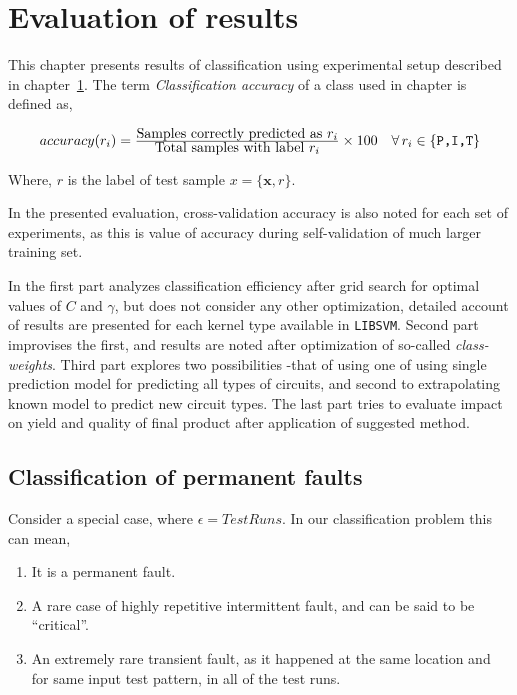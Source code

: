 \chapter{Evaluation of results}
\label{chap:chapter6}
This chapter presents results of classification using experimental setup described in chapter~\ref{chap:chapter6}. The term \emph{Classification accuracy} of a class used in chapter is defined as,

\[ \begin{array}{ll} accuracy(r_i) = \frac{\mbox{Samples correctly predicted as $r_i$}}
								{\mbox{Total samples with label $r_i$}}
							\times 100 & 
							\forall \,r_i \in \{\mbox{\texttt{P,I,T}}\} 
	\end{array}\]

Where, $r$ is the label of test sample $x=\{\boldsymbol{x},r\}$.

In the presented evaluation, cross-validation accuracy is also noted for each set of experiments, as this is value of accuracy during self-validation of much larger training set.

In the first part analyzes classification efficiency after grid search for optimal values of $C$ and $\gamma$, but does not consider any other optimization, detailed account of results are presented for each kernel type available in \texttt{LIBSVM}. Second part improvises the first, and results are noted after optimization of so-called \emph{class-weights}. Third part explores two possibilities -that of using one  of using single prediction model for predicting all types of circuits, and second to extrapolating known model to predict new circuit types. The last part tries to evaluate impact on yield and quality of final product after application of suggested method.

\section{Classification of permanent faults}

Consider a special case, where $\epsilon = Test Runs$. In our classification problem this can mean,
\begin{enumerate}
  \item It is a permanent fault.
  \item A rare case of highly repetitive intermittent fault, and can be said to be \enquote{critical}.
  \item An extremely rare transient fault, as it happened at the same location and for same input test pattern, in all of the test runs.
\end{enumerate}

